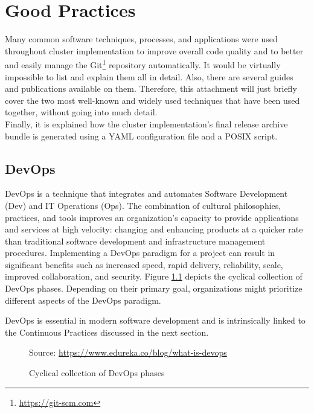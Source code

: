 \chapter{Good Practices}
\label{cha:good_practices}

Many common software techniques, processes, and applications were used throughout
cluster implementation to improve overall code quality and to better and easily manage
the Git\footnote{\url{https://git-scm.com}} repository automatically. It would
be virtually impossible to list and explain them all in detail. Also, there are
several guides and publications available on them. Therefore, this attachment
will just briefly cover the two most well-known and widely used techniques that
have been used together, without going into much detail. \\ %
Finally, it is explained how the cluster implementation's final release archive
bundle is generated using a YAML configuration file and a POSIX script.

\section{DevOps}
\label{sec:good_practices_devops}

DevOps is a technique that integrates and automates Software Development (Dev) and
IT Operations (Ops). The combination of cultural philosophies, practices, and
tools improves an organization's capacity to provide applications and services
at high velocity: changing and enhancing products at a quicker rate than traditional
software development and infrastructure management procedures. Implementing a
DevOps paradigm for a project can result in significant benefits such as
increased speed, rapid delivery, reliability, scale, improved collaboration, and
security\cite{devops}. Figure \ref{fig:devops} depicts the cyclical collection of
DevOps phases. Depending on their primary goal, organizations might prioritize different
aspects of the DevOps paradigm.

DevOps is essential in modern software development and is intrinsically linked to
the Continuous Practices discussed in the next section.

\begin{figure}[htbp]
  \centering
  \def\stackalignment{r} %
  {\scriptsize Source: \url{https://www.edureka.co/blog/what-is-devops} }
  \caption{Cyclical collection of DevOps phases}
  \label{fig:devops}
\end{figure}

